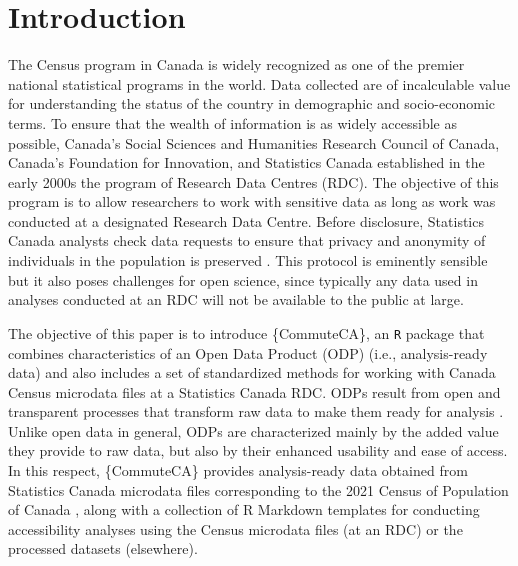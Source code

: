 \documentclass[sn-basic,lineno,pdflatex]{sn-jnl}
\begin{document}



\maketitle

\section{Introduction}\label{introduction}

The Census program in Canada is widely recognized as one of the premier
national statistical programs in the world. Data collected are of
incalculable value for understanding the status of the country in
demographic and socio-economic terms. To ensure that the wealth of
information is as widely accessible as possible, Canada's Social
Sciences and Humanities Research Council of Canada, Canada's Foundation
for Innovation, and Statistics Canada established in the early 2000s the
program of Research Data Centres (RDC). The objective of this program is
to allow researchers to work with sensitive data as long as work was
conducted at a designated Research Data Centre. Before disclosure,
Statistics Canada analysts check data requests to ensure that privacy
and anonymity of individuals in the population is preserved
\citep{goldmann_research_2003}. This protocol is eminently sensible but
it also poses challenges for open science, since typically any data used
in analyses conducted at an RDC will not be available to the public at
large.

The objective of this paper is to introduce \{CommuteCA\}, an \texttt{R}
package that combines characteristics of an Open Data Product (ODP)
(i.e., analysis-ready data) and also includes a set of standardized
methods for working with Canada Census microdata files at a Statistics
Canada RDC. ODPs result from open and transparent processes that
transform raw data to make them ready for analysis
\citep{arribas-bel2021}. Unlike open data in general, ODPs are
characterized mainly by the added value they provide to raw data, but
also by their enhanced usability and ease of access. In this respect,
\{CommuteCA\} provides analysis-ready data obtained from Statistics
Canada microdata files corresponding to the 2021 Census of Population of
Canada \citep{statisticscanada2023}, along with a collection of R
Markdown templates for conducting accessibility analyses using the
Census microdata files (at an RDC) or the processed datasets
(elsewhere).
\end{document}
